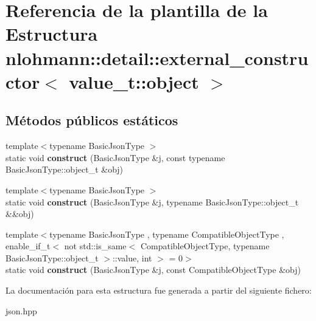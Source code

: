 \hypertarget{structnlohmann_1_1detail_1_1external__constructor_3_01value__t_1_1object_01_4}{}\section{Referencia de la plantilla de la Estructura nlohmann\+:\+:detail\+:\+:external\+\_\+constructor$<$ value\+\_\+t\+:\+:object $>$}
\label{structnlohmann_1_1detail_1_1external__constructor_3_01value__t_1_1object_01_4}
\subsection*{Métodos públicos estáticos}
\begin{DoxyCompactItemize}
\item 
\mbox{\label{structnlohmann_1_1detail_1_1external__constructor_3_01value__t_1_1object_01_4_a3a369c5d49596dd4411e368425f9ac7a}} 
{\footnotesize template$<$typename Basic\+Json\+Type $>$ }\\static void {\bfseries construct} (Basic\+Json\+Type \&j, const typename Basic\+Json\+Type\+::object\+\_\+t \&obj)
\item 
\mbox{\label{structnlohmann_1_1detail_1_1external__constructor_3_01value__t_1_1object_01_4_a1e044961affbd6417386d6e9f1d545e9}} 
{\footnotesize template$<$typename Basic\+Json\+Type $>$ }\\static void {\bfseries construct} (Basic\+Json\+Type \&j, typename Basic\+Json\+Type\+::object\+\_\+t \&\&obj)
\item 
\mbox{\label{structnlohmann_1_1detail_1_1external__constructor_3_01value__t_1_1object_01_4_a91f89abe0ec4dec59099b691682ff927}} 
{\footnotesize template$<$typename Basic\+Json\+Type , typename Compatible\+Object\+Type , enable\+\_\+if\+\_\+t$<$ not std\+::is\+\_\+same$<$ Compatible\+Object\+Type, typename Basic\+Json\+Type\+::object\+\_\+t $>$\+::value, int $>$  = 0$>$ }\\static void {\bfseries construct} (Basic\+Json\+Type \&j, const Compatible\+Object\+Type \&obj)
\end{DoxyCompactItemize}


La documentación para esta estructura fue generada a partir del siguiente fichero\+:\begin{DoxyCompactItemize}
\item 
json.\+hpp\end{DoxyCompactItemize}
